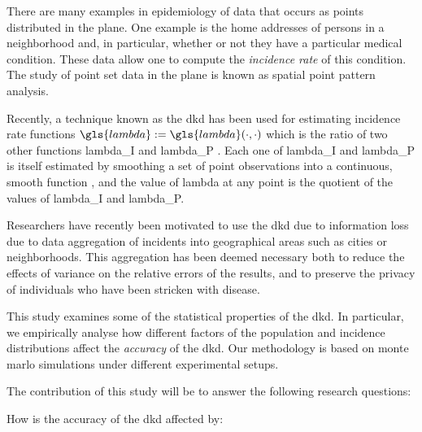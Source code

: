 

There are many examples in epidemiology of data that occurs as points distributed in the plane.
One example is
the home addresses of persons in a neighborhood and,
in particular, whether or not they have a particular medical condition.
These data allow one to compute the \textit{\gls{incidence rate}} of this condition.
The study of point set data in the plane is known as spatial point pattern analysis.

Recently, a technique known as the \gls{dkd} has been used for estimating \gls{incidence rate} functions
$\gls{lambda} := \gls{lambda}\dotdot$
which is the ratio of two other functions \gls{lambda_I} and \gls{lambda_P} \citep{portnov2009studying,kloog2009using,zusman2012residential}.
Each one of \gls{lambda_I} and \gls{lambda_P} is itself estimated by smoothing a set of point observations into a continuous,
smooth function \citep{bithell1990application},
and the value of \gls{lambda} at any point is the quotient of the values of
\gls{lambda_I} and \gls{lambda_P}.

Researchers have recently been motivated to use the \gls{dkd} due to information loss due to data aggregation of incidents into geographical areas such as cities or neighborhoods.
This aggregation has been deemed necessary both
to reduce the effects of variance on the relative errors of the results,
and to preserve the privacy of individuals who have been stricken with disease.

This study examines some of the statistical properties of the \gls{dkd}.
In particular,
we empirically analyse how different factors of the population and incidence distributions
affect the \textit{accuracy} of the \gls{dkd}.
Our methodology is based on monte marlo simulations under different experimental setups.

The contribution of this study will be to answer the following research questions:

\begin{question}
    \label{thm:accuracy-affected}
    How is the accuracy of the \gls{dkd} affected by:
\end{question}

